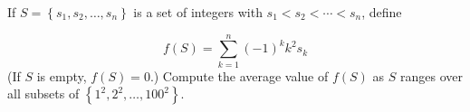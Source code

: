 If $S=\left\{s_{1}, s_{2}, \ldots, s_{n}\right\}$ is a set of integers with $s_{1}<s_{2}<\cdots<s_{n}$, define

$$
f(S)=\sum_{k=1}^{n}(-1)^{k} k^{2} s_{k}
$$
(If $S$ is empty, $f(S)=0$.) Compute the average value of $f(S)$ as $S$ ranges over all subsets of $\left\{1^{2}, 2^{2}, \ldots, 100^{2}\right\}$.